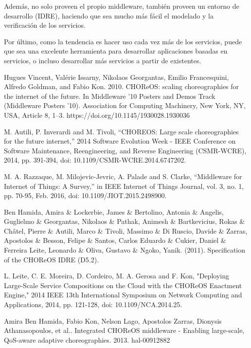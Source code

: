 \documentclass[runningheads]{llncs}
\begin{document}
Además, no solo proveen el propio middleware, también proveen un entorno de desarrollo (IDRE), haciendo que sea mucho más fácil el modelado y la verificación de los servicios.

Por último, como la tendencia es hacer uso cada vez más de los servicios, puede que sea una excelente herramienta para desarrollar aplicaciones basadas en servicios, o incluso desarrollar más servicios a partir de existentes.

%
%
%
% 
% 
%
\begin{thebibliography}{8}
Hugues Vincent, Valérie Issarny, Nikolaos Georgantas, Emilio Francesquini, Alfredo Goldman, and Fabio Kon. 2010. CHOReOS: scaling choreographies for the internet of the future. In Middleware '10 Posters and Demos Track (Middleware Posters '10). Association for Computing Machinery, New York, NY, USA, Article 8, 1–3. https://doi.org/10.1145/1930028.1930036

M. Autili, P. Inverardi and M. Tivoli, ``CHOREOS: Large scale choreographies for the future internet,'' 2014 Software Evolution Week - IEEE Conference on Software Maintenance, Reengineering, and Reverse Engineering (CSMR-WCRE), 2014, pp. 391-394, doi: 10.1109/CSMR-WCRE.2014.6747202.

M. A. Razzaque, M. Milojevic-Jevric, A. Palade and S. Clarke, ``Middleware for Internet of Things: A Survey,'' in IEEE Internet of Things Journal, vol. 3, no. 1, pp. 70-95, Feb. 2016, doi: 10.1109/JIOT.2015.2498900.

Ben Hamida, Amira \& Lockerbie, James \& Bertolino, Antonia \& Angelis, Guglielmo \& Georgantas, Nikolaos \& Pathak, Animesh \& Bartkevicius, Rokas \& Châtel, Pierre \& Autili, Marco \& Tivoli, Massimo \& Di Ruscio, Davide \& Zarras, Apostolos \& Besson, Felipe \& Santos, Carlos Eduardo \& Cukier, Daniel \& Ferreira Leite, Leonardo \& Oliva, Gustavo \& Ngoko, Yanik. (2011). Specification of the CHOReOS IDRE (D5.2). 

L. Leite, C. E. Moreira, D. Cordeiro, M. A. Gerosa and F. Kon, "Deploying Large-Scale Service Compositions on the Cloud with the CHOReOS Enactment Engine," 2014 IEEE 13th International Symposium on Network Computing and Applications, 2014, pp. 121-128, doi: 10.1109/NCA.2014.25.


Amira Ben Hamida, Fabio Kon, Nelson Lago, Apostolos Zarras, Dionysis Athanasopoulos, et al.. Integrated CHOReOS middleware - Enabling large-scale, QoS-aware adaptive choreographies. 2013. hal-00912882

\end{thebibliography}
\end{document}
